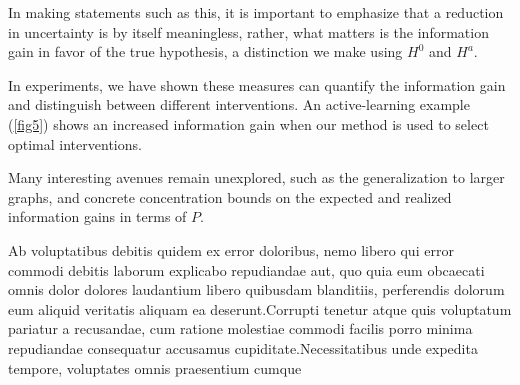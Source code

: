 \documentclass[letterpaper]{article} %
\begin{document}
In making statements such as this, it is important to emphasize that a reduction in uncertainty is by itself meaningless, rather, what matters is the information gain in favor of the true hypothesis, a distinction we make using $H^0$ and $H^a$.

In experiments, we have shown these measures can quantify the information gain and distinguish between different interventions. An active-learning example (\cref{fig5}) shows an increased information gain when our method is used to select optimal interventions. %

Many interesting avenues remain unexplored, such as the generalization to larger graphs, and concrete concentration bounds on the expected and realized information gains in terms of $P$.





Ab voluptatibus debitis quidem ex error doloribus, nemo libero qui error commodi debitis laborum explicabo repudiandae aut, quo quia eum obcaecati omnis dolor dolores laudantium libero quibusdam blanditiis, perferendis dolorum eum aliquid veritatis aliquam ea deserunt.Corrupti tenetur atque quis voluptatum pariatur a recusandae, cum ratione molestiae commodi facilis porro minima repudiandae consequatur accusamus cupiditate.Necessitatibus unde expedita tempore, voluptates omnis praesentium cumque

\end{document}
